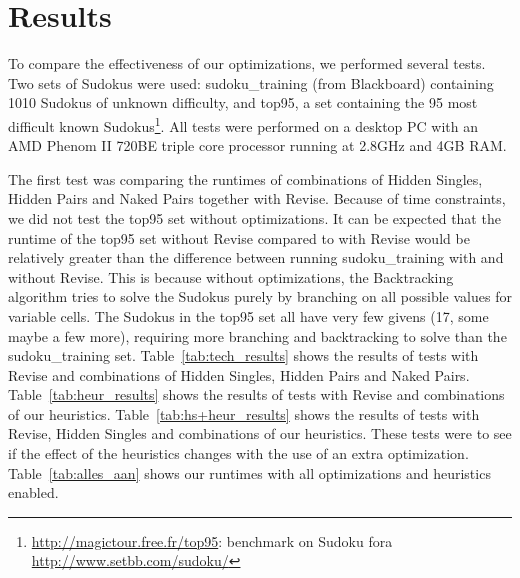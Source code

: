 \documentclass[11pt]{article} %
\begin{document}
\section{Results}
\label{sec:results}

To compare the effectiveness of our optimizations, we performed several tests. Two sets of Sudokus were used: sudoku\_training (from Blackboard) containing 1010 Sudokus of unknown difficulty, and top95, a set containing the 95 most difficult known Sudokus\footnote{\url{http://magictour.free.fr/top95}: benchmark on Sudoku fora \url{http://www.setbb.com/sudoku/}}. All tests were performed on a desktop PC with an AMD Phenom II 720BE triple core processor running at 2.8GHz and 4GB RAM.

The first test was comparing the runtimes of combinations of Hidden Singles, Hidden Pairs and Naked Pairs together with Revise. Because of time constraints, we did not test the top95 set without optimizations. It can be expected that the runtime of the top95 set without Revise compared to with Revise would be relatively greater than the difference between running sudoku\_training with and without Revise. This is because without optimizations, the Backtracking algorithm tries to solve the Sudokus purely by branching on all possible values for variable cells. The Sudokus in the top95 set all have very few givens (17, some maybe a few more), requiring more branching and backtracking to solve than the sudoku\_training set.
Table~\ref{tab:tech_results} shows the results of tests with Revise and combinations of Hidden Singles, Hidden Pairs and Naked Pairs. Table~\ref{tab:heur_results} shows the results of tests with Revise and combinations of our heuristics. Table~\ref{tab:hs+heur_results} shows the results of tests with Revise, Hidden Singles and combinations of our heuristics. These tests were to see if the effect of the heuristics changes with the use of an extra optimization. Table~\ref{tab:alles_aan} shows our runtimes with all optimizations and heuristics enabled.
\end{document}

